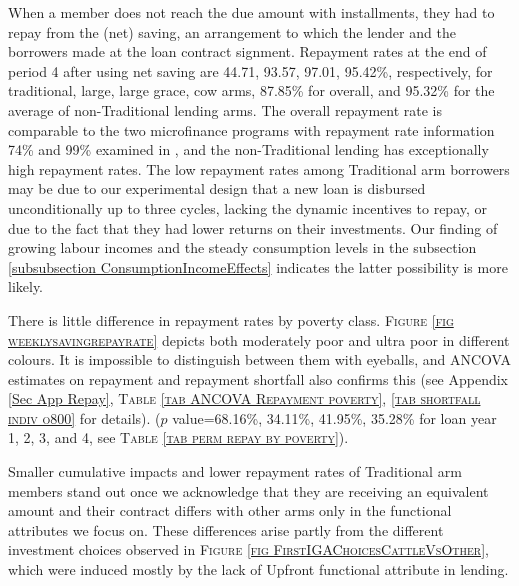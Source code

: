 	When a member does not reach the due amount with installments, they had to repay from the (net) saving, an arrangement to which the lender and the borrowers made at the loan contract signment. Repayment rates at the end of period 4 after using net saving are 44.71, 93.57, 97.01, 95.42\%, respectively, for \textsf{traditional, large, large grace, cow} arms, 87.85\% for overall, and 95.32\% for the average of non-\textsf{Traditional} lending arms. %
	The overall repayment rate is comparable to the two microfinance programs with repayment rate information 74\% and 99\% examined in \citet{BanerjeeKarlanZinman2015}, and the non-\textsf{Traditional} lending has exceptionally high repayment rates. The low repayment rates among \textsf{Traditional} arm borrowers may be due to our experimental design that a new loan is disbursed unconditionally up to three cycles, lacking the dynamic incentives to repay, or due to the fact that they had lower returns on their investments. Our finding of growing labour incomes and the steady consumption levels in the subsection \ref{subsubsection ConsumptionIncomeEffects} indicates the latter possibility is more likely. 

	There is little difference in repayment rates by poverty class. \textsc{\footnotesize Figure \ref{fig weeklysavingrepayrate}} depicts both moderately poor and ultra poor in different colours. It is impossible to distinguish between them with eyeballs, and ANCOVA estimates on repayment and repayment shortfall also confirms this  (see Appendix \ref{Sec App Repay}, \textsc{\small Table \ref{tab ANCOVA Repayment poverty}, \ref{tab shortfall indiv o800}} for details).  ($p$ value=68.16\%, 34.11\%, 41.95\%, 35.28\% for loan year 1, 2, 3, and 4, see \textsc{\normalsize Table \ref{tab perm repay by poverty}}). 

	Smaller cumulative impacts and lower repayment rates of \textsf{Traditional} arm members stand out once we acknowledge that they are receiving an equivalent amount and their contract differs with other arms only in the functional attributes we focus on. These differences arise partly from the different investment choices observed in \textsc{\small Figure \ref{fig FirstIGAChoicesCattleVsOther}}, which were induced mostly by the lack of \textsf{Upfront} functional attribute in lending.
	
